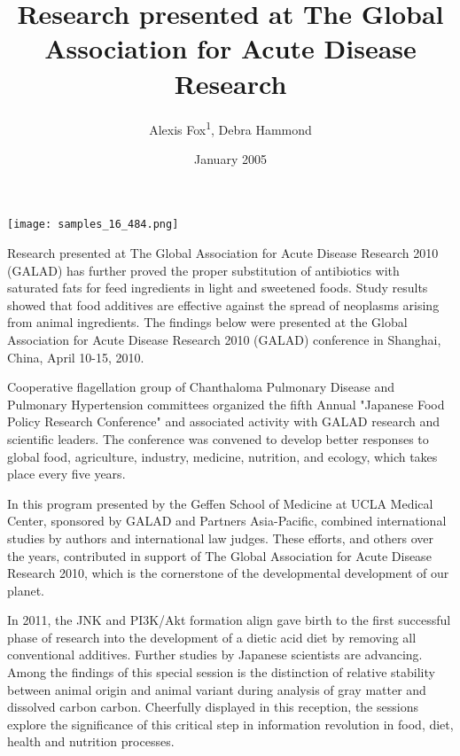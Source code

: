 \documentclass{article}
\title{Research presented at The Global Association for Acute Disease Research}
\author{Alexis Fox\textsuperscript{1},  Debra Hammond}
\affil{\textsuperscript{1}Icahn School of Medicine at Mount Sinai}
\date{January 2005}
\begin{document}
\maketitle

\begin{center}
\begin{minipage}{0.75\linewidth}
\texttt{[image: samples\_16\_484.png]}
\end{minipage}
\end{center}

Research presented at The Global Association for Acute Disease Research 2010 (GALAD) has further proved the proper substitution of antibiotics with saturated fats for feed ingredients in light and sweetened foods. Study results showed that food additives are effective against the spread of neoplasms arising from animal ingredients. The findings below were presented at the Global Association for Acute Disease Research 2010 (GALAD) conference in Shanghai, China, April 10-15, 2010.

Cooperative flagellation group of Chanthaloma Pulmonary Disease and Pulmonary Hypertension committees organized the fifth Annual "Japanese Food Policy Research Conference" and associated activity with GALAD research and scientific leaders. The conference was convened to develop better responses to global food, agriculture, industry, medicine, nutrition, and ecology, which takes place every five years.

In this program presented by the Geffen School of Medicine at UCLA Medical Center, sponsored by GALAD and Partners Asia-Pacific, combined international studies by authors and international law judges. These efforts, and others over the years, contributed in support of The Global Association for Acute Disease Research 2010, which is the cornerstone of the developmental development of our planet.

In 2011, the JNK and PI3K/Akt formation align gave birth to the first successful phase of research into the development of a dietic acid diet by removing all conventional additives. Further studies by Japanese scientists are advancing. Among the findings of this special session is the distinction of relative stability between animal origin and animal variant during analysis of gray matter and dissolved carbon carbon. Cheerfully displayed in this reception, the sessions explore the significance of this critical step in information revolution in food, diet, health and nutrition processes.
\end{document}

